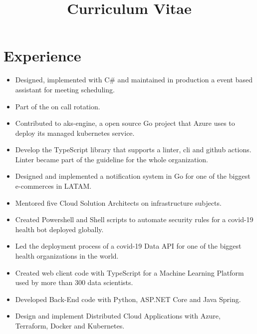 \documentclass[10pt, a4paper, roman]{moderncv} %
\title{Curriculum Vitae}
\begin{document}
\makecvtitle %

\section{Experience}

{
    \begin{itemize}
	    \item Designed, implemented with C\# and maintained in production a event based assistant for meeting scheduling.
	    \item Part of the on call rotation.
    \end{itemize}
}

{
    \begin{itemize}
	    \item Contributed to aks-engine, a open source Go project that Azure uses to deploy its managed kubernetes service. 
	    \item Develop the TypeScript library that supports a linter, cli and github actions. Linter became part of the guideline for the whole organization.
        \item Designed and implemented a notification system in Go for one of the biggest e-commerces in LATAM.
        \item Mentored five Cloud Solution Architects on infrastructure subjects.
        \item Created Powershell and Shell scripts to automate security rules for a covid-19 health bot deployed globally.
        \item Led the deployment process of a covid-19 Data API for one of the biggest health organizations in the world.
    \end{itemize}
}

{
    \begin{itemize}
        \item Created web client code with TypeScript for a Machine Learning Platform used by more than 300 data scientists.
        \item Developed Back-End code with Python, ASP.NET Core and Java Spring.
	    \item Design and implement Distributed Cloud Applications with Azure, Terraform, Docker and Kubernetes.
    \end{itemize}
}
\end{document}

